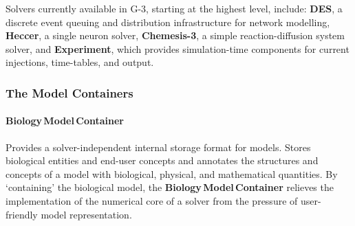 \documentclass{article}
\begin{document}
Solvers currently available in G-3, starting at the highest level, include: {\bf DES}, a discrete event queuing and distribution infrastructure for network modelling, {\bf Heccer}, a single neuron solver, {\bf Chemesis-3}, a simple reaction-diffusion system solver, and {\bf Experiment}, which provides simulation-time components for current injections, time-tables, and output.




\subsubsection{The Model Containers}

\paragraph{Biology\,Model\,Container}
Provides a solver-independent internal storage
format for models. Stores biological entities and
end-user concepts and annotates the structures and concepts of a
model with biological, physical, and mathematical quantities. By
`containing' the biological model, the {\bf Biology\,Model\,Container}
relieves the implementation of the numerical core of a solver from the
pressure of user-friendly model representation.
\end{document}
